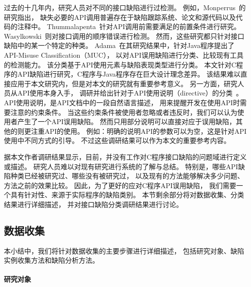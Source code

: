 过去的十几年内，研究人员对不同的接口缺陷进行过检测。
例如，Monperrus~\cite{13-tosem-missing-call}的研究指出，
缺失必要的API调用普遍存在于缺陷跟踪系统、论文和源代码以及代码的注释中。
Thummalapenta~\cite{09-icse-exception}针对API调用前需要满足的前置条件进行研究。
Wasylkowski~\cite{07-fse-object}则对接口调用的顺序错误进行检测。
然而，这些研究都只针对接口缺陷中的某一个特定的种类。
Adama~\cite{survey18}在其研究结果中，针对Java程序提出了API-Misuse Classification（MUC），
以对API误用缺陷进行分类、比较现有工具的检测能力。
该分类基于API使用元素与缺陷表现类型进行分类。
本文针对C程序的API缺陷进行研究，C程序与Java程序存在巨大设计理念差异。
该结果难以直接应用于本文研究内，但是对本文的研究就有重要参考意义。
另一方面，研究人员从API使用本身入手，
调研并给出针对于API使用说明（directive）的分类~\cite{09-icse-doc,12-ese-directive}。
API使用说明，是API文档中的一段自然语言描述，
用来提醒开发在使用API时需要注意的约束条件。
当这些约束条件被使用者忽略或者违反时，我们可以认为使用者产生了一个API误用缺陷。
然而只用部分说明可以直接对应于误用缺陷，其他的则更注重API的使用。
例如：明确的说明API的参数可以为空，这是针对API使用中不同方式的引导。
不过这些调研结果可以作为本文的重要参考内容。


据本文作者调研结果显示，目前，并没有工作对C程序接口缺陷的问题域进行定义或描述。
研究人员难以对现有研究进行系统的了解与总结。
特别是，哪些API缺陷种类已经被研究过、哪些没有被研究过，
以及现有的方法能够解决多少问题、方法之前的效果比较。
因此，为了更好的应对C程序API误用缺陷，
我们需要一个具有针对性、来源于实际程序的缺陷类别。
本节剩余部分将对数据收集、分类结果进行详细描述，
并对接口缺陷分类调研结果进行讨论。

\subsection{数据收集}
本小结中，我们将针对数据收集的主要步骤进行详细描述，
包括研究对象、缺陷实例收集方法和缺陷分析方法。

\paragraph{研究对象}

